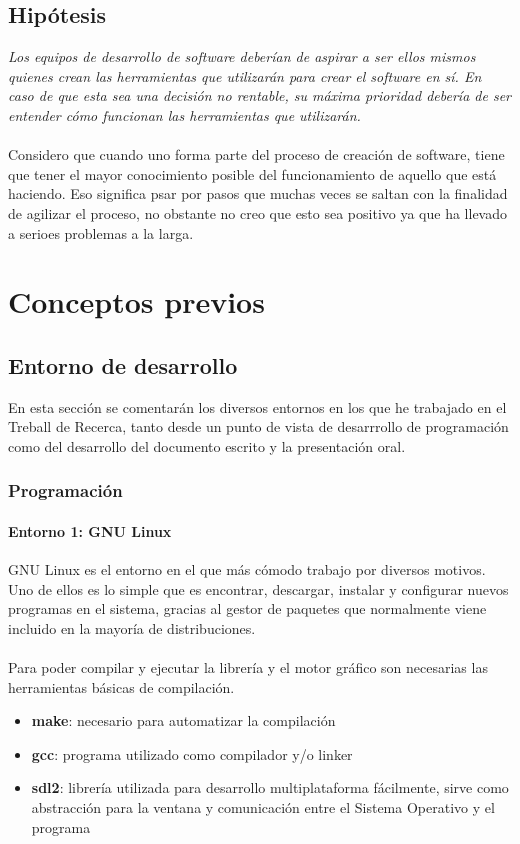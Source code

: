 \documentclass{report}
\begin{document}
\section{Hipótesis}
\textit{Los equipos de desarrollo de software deberían de aspirar a ser ellos mismos quienes crean las herramientas que utilizarán para crear el software en sí. En caso de que esta sea una decisión no rentable, su máxima prioridad debería de ser entender cómo funcionan las herramientas que utilizarán.}
\\\\
Considero que cuando uno forma parte del proceso de creación de software, tiene que tener el mayor conocimiento posible del funcionamiento de aquello que está haciendo. Eso significa psar por pasos que muchas veces se saltan con la finalidad de agilizar el proceso, no obstante no creo que esto sea positivo ya que ha llevado a serioes problemas a la larga.

\newpage

\chapter{Conceptos previos}
\section{Entorno de desarrollo}
En esta sección se comentarán los diversos entornos en los que he trabajado en el Treball de Recerca, tanto desde un punto de vista de desarrrollo de programación como del desarrollo del documento escrito y la presentación oral.
\subsection{Programación}
\subsubsection{Entorno 1: GNU Linux}
GNU Linux es el entorno en el que más cómodo trabajo por diversos motivos. Uno de ellos es lo simple que es encontrar, descargar, instalar y configurar nuevos programas en el sistema, gracias al gestor de paquetes que normalmente viene incluido en la mayoría de distribuciones.
\\\\
Para poder compilar y ejecutar la librería y el motor gráfico son necesarias las herramientas básicas de compilación.
\begin{itemize}
\item{\textbf{make}: necesario para automatizar la compilación}
\item{\textbf{gcc}: programa utilizado como compilador y/o linker}
\item{\textbf{sdl2}: librería utilizada para desarrollo multiplataforma fácilmente, sirve como abstracción para la ventana y comunicación entre el Sistema Operativo y el programa}
\end{itemize}
\end{document}
